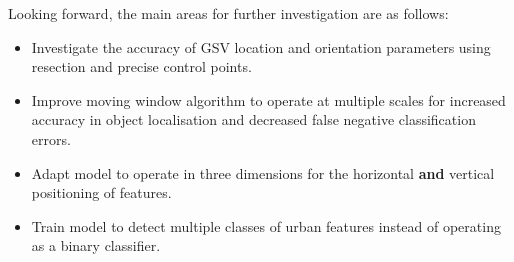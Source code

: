 Looking forward, the main areas for further investigation are as follows:
\begin{itemize}
    \item Investigate the accuracy of GSV location and orientation parameters using resection and precise control points.
    \item Improve moving window algorithm to operate at multiple scales for increased accuracy in object localisation and decreased false negative classification errors.
    \item Adapt model to operate in three dimensions for the horizontal \textbf{and} vertical positioning of features.
    \item Train model to detect multiple classes of urban features instead of operating as a binary classifier.
\end{itemize}